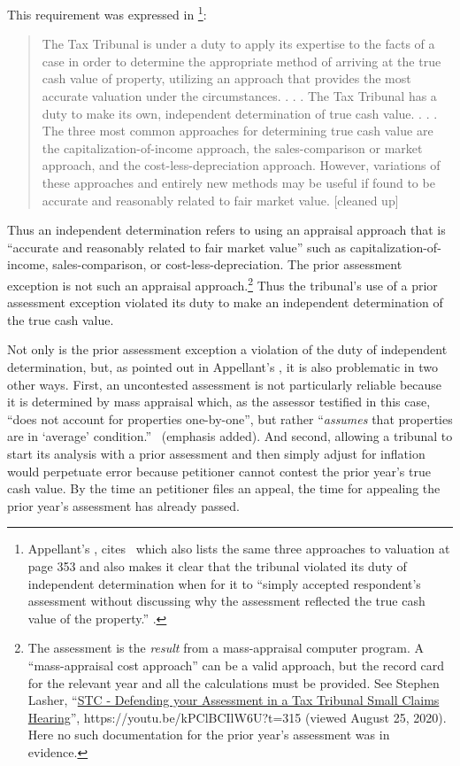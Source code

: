 \documentclass[12pt,\documentclassflag]{michiganCourtOfAppealsBrief}
\begin{document}
This requirement was expressed in \footnote{Appellant's , cites \cite{Jones & Laughlin}\ which also lists the same three approaches to valuation at page 353 and also makes it clear that the tribunal violated its duty of independent determination when for it to ``simply accepted respondent's  assessment without discussing why the assessment reflected the true cash value of the property.'' .}:

\begin{quotation}
  The Tax Tribunal is under a duty to apply its expertise to the facts of a case in order to determine the appropriate method of arriving at the true cash value of property, utilizing an approach that provides the most accurate valuation under the circumstances. . . .
  The Tax Tribunal has a duty to make its own, independent determination of true cash value. . . .
  The three most common approaches for determining true cash value are the capitalization-of-income approach, the sales-comparison or market approach, and the cost-less-depreciation approach. However, variations of these approaches and entirely new methods may be useful if found to be accurate and reasonably related to fair market value. [cleaned up]
\end{quotation}

Thus an independent determination refers to using an appraisal approach that is ``accurate and reasonably related to fair market value'' such as capitalization-of-income, sales-comparison, or cost-less-depreciation. The prior assessment exception is not such an appraisal approach.\footnote{The assessment is the \emph{result} from a mass-appraisal computer program. A ``mass-appraisal cost approach'' can be a valid approach, but the record card for the relevant year and all the calculations must be provided. See Stephen Lasher, ``\href{https://youtu.be/kPClBCIlW6U?t=315}{STC - Defending your Assessment in a Tax Tribunal Small Claims Hearing}'', https://youtu.be/kPClBCIlW6U?t=315 (viewed August 25, 2020). Here no such documentation for the prior year's assessment was in evidence.} Thus the tribunal's use of a prior assessment exception violated its duty to make an independent determination of the true cash value.

Not only is the prior assessment exception a violation of the duty of independent determination, but, as pointed out in Appellant's , it is also problematic in two other ways. First, an uncontested assessment is not particularly reliable because it is determined by mass appraisal which, as the assessor testified in this case, ``does not account for properties one-by-one'', but rather ``{\em assumes} that properties are in `average' condition.'' \ (emphasis added). And second, allowing a tribunal to start its analysis with a prior assessment and then simply adjust for inflation would perpetuate error because petitioner cannot contest the prior year's true cash value. By the time an petitioner files an appeal, the time for appealing the prior year's assessment has already passed.
\end{document}
